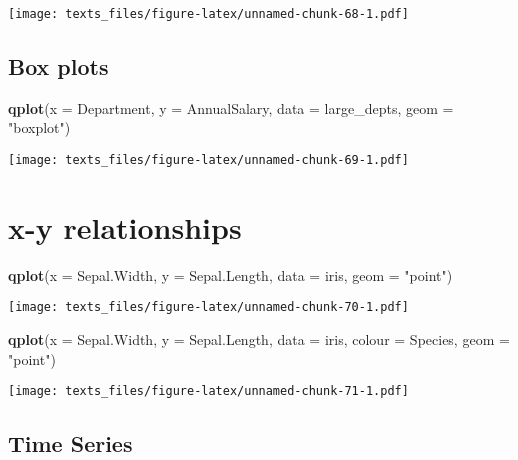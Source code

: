 \documentclass[]{book}
\newenvironment{Shaded}{\begin{snugshade}}{\end{snugshade}}
\newcommand{\DataTypeTok}[1]{\textcolor[rgb]{0.13,0.29,0.53}{#1}}
\newcommand{\KeywordTok}[1]{\textcolor[rgb]{0.13,0.29,0.53}{\textbf{#1}}}
\newcommand{\NormalTok}[1]{#1}
\newcommand{\StringTok}[1]{\textcolor[rgb]{0.31,0.60,0.02}{#1}}
\begin{document}
\texttt{[image: texts\_files/figure-latex/unnamed-chunk-68-1.pdf]}

\hypertarget{qplotbox}{%
\subsection*{Box plots}\label{qplotbox}}

\begin{Shaded}
\begin{Highlighting}[]
\KeywordTok{qplot}\NormalTok{(}\DataTypeTok{x =}\NormalTok{ Department, }\DataTypeTok{y =}\NormalTok{ AnnualSalary, }\DataTypeTok{data =}\NormalTok{ large_depts, }\DataTypeTok{geom =} \StringTok{"boxplot"}\NormalTok{) }
\end{Highlighting}
\end{Shaded}

\texttt{[image: texts\_files/figure-latex/unnamed-chunk-69-1.pdf]}

\hypertarget{plotxy}{%
\section*{x-y relationships}\label{plotxy}}

\begin{Shaded}
\begin{Highlighting}[]
\KeywordTok{qplot}\NormalTok{(}\DataTypeTok{x =}\NormalTok{ Sepal.Width, }\DataTypeTok{y =}\NormalTok{ Sepal.Length, }\DataTypeTok{data =}\NormalTok{ iris, }\DataTypeTok{geom =} \StringTok{"point"}\NormalTok{)}
\end{Highlighting}
\end{Shaded}

\texttt{[image: texts\_files/figure-latex/unnamed-chunk-70-1.pdf]}

\begin{Shaded}
\begin{Highlighting}[]
\KeywordTok{qplot}\NormalTok{(}\DataTypeTok{x =}\NormalTok{ Sepal.Width, }\DataTypeTok{y =}\NormalTok{ Sepal.Length, }\DataTypeTok{data =}\NormalTok{ iris, }\DataTypeTok{colour =}\NormalTok{ Species, }\DataTypeTok{geom =} \StringTok{"point"}\NormalTok{)}
\end{Highlighting}
\end{Shaded}

\texttt{[image: texts\_files/figure-latex/unnamed-chunk-71-1.pdf]}

\hypertarget{plotts}{%
\subsection*{Time Series}\label{plotts}}
\end{document}
